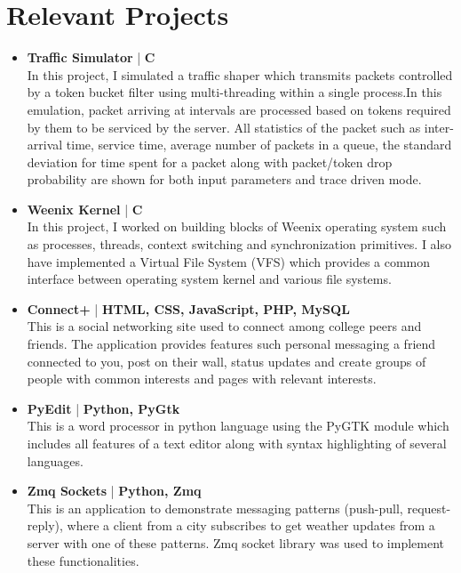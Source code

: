 \section{Relevant Projects}
\begin{itemize}
 \item \textbf{Traffic Simulator} | \textbf{C}\\
In this project, I simulated a traffic shaper which transmits packets controlled by a token bucket filter using multi-threading within a single process.In this emulation, packet arriving at intervals are processed based on tokens required by them to be serviced by the server. All statistics of the packet such as inter-arrival time, service time, average number of packets in a queue, the standard deviation for time spent for a packet along with packet/token drop probability are shown for both input parameters and trace driven mode. 

 \item \textbf{Weenix Kernel} | \textbf{C}\\
In this project, I worked on building blocks of Weenix operating system such as processes, threads, context switching and synchronization primitives. I also have implemented a Virtual File System (VFS) which provides a common interface between operating system kernel and various file systems.

 \item \textbf{Connect+} | \textbf{HTML, CSS, JavaScript, PHP, MySQL}\\
This is a social networking site used to connect among college peers and friends. The application provides features such personal messaging a friend connected to you, post on their wall, status updates and create groups of people with common interests and pages with relevant interests.

 \item \textbf{PyEdit} | \textbf {Python, PyGtk} \\
This is a word processor in python language using the PyGTK module which includes all features of a text editor along with syntax highlighting of several languages.

 \item \textbf{Zmq Sockets} | \textbf { Python, Zmq}\\
 This is an application to demonstrate messaging patterns (push-pull, request-reply), where a client from a city subscribes to get weather updates from a server with one of these patterns. Zmq socket library was used to implement these functionalities.
 
\end{itemize}
\vspace{5pt}